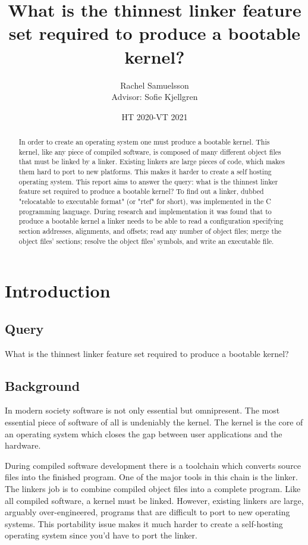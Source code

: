 \documentclass{article}
\title{What is the thinnest linker feature set required to produce a bootable kernel?}
\author{Rachel Samuelsson \\
	{\small Advisor: Sofie Kjellgren}}
\affil{NTI Johanneberg}
\date{HT 2020-VT 2021}
\begin{document}
\maketitle

\begin{abstract}

In order to create an operating system one must produce a bootable kernel. This kernel, like any piece of compiled software, is composed of many different object files that must be linked by a linker. Existing linkers are large pieces of code, which makes them hard to port to new platforms. This makes it harder to create a self hosting operating system. This report aims to answer the query: what is the thinnest linker feature set required to produce a bootable kernel? To find out a linker, dubbed "relocatable to executable format" (or "rtef" for short), was implemented in the C programming language. During research and implementation it was found that to produce a bootable kernel a linker needs to be able to read a configuration specifying section addresses, alignments, and offsets; read any number of object files; merge the object files' sections; resolve the object files' symbols, and write an executable file.
\end{abstract}

\tableofcontents
\newpage

\section{Introduction}

\subsection{Query}

What is the thinnest linker feature set required to produce a bootable kernel?

\subsection{Background}

In modern society software is not only essential but omnipresent. The most essential piece of software of all is undeniably the kernel. The kernel is the core of an operating system which closes the gap between user applications and the hardware.

During compiled software development there is a toolchain which converts source files into the finished program. One of the major tools in this chain is the linker. The linkers job is to combine compiled object files into a complete program. Like all compiled software, a kernel must be linked. However, existing linkers are large, arguably over-engineered, programs that are difficult to port to new operating systems. This portability issue makes it much harder to create a self-hosting operating system since you'd have to port the linker.
\end{document}
